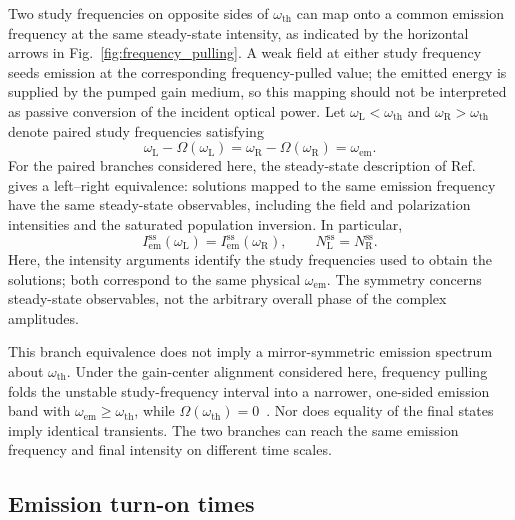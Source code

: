 \documentclass{optica-article}
\begin{document}
Two study frequencies on opposite sides of $\omega_{\mathrm{th}}$ can map onto a common emission frequency at the same steady-state intensity, as indicated by the horizontal arrows in Fig.~\ref{fig:frequency_pulling}. A weak field at either study frequency seeds emission at the corresponding frequency-pulled value; the emitted energy is supplied by the pumped gain medium, so this mapping should not be interpreted as passive conversion of the incident optical power. Let $\omega_{\mathrm{L}}<\omega_{\mathrm{th}}$ and $\omega_{\mathrm{R}}>\omega_{\mathrm{th}}$ denote paired study frequencies satisfying
\begin{equation}
\omega_{\mathrm{L}}-\Omega(\omega_{\mathrm{L}})
=\omega_{\mathrm{R}}-\Omega(\omega_{\mathrm{R}})
=\omega_{\mathrm{em}}.
\label{eq:pulling_branches}
\end{equation}
For the paired branches considered here, the steady-state description of Ref.~\cite{Aradian:2024} gives a left--right equivalence: solutions mapped to the same emission frequency have the same steady-state observables, including the field and polarization intensities and the saturated population inversion. In particular,
\begin{equation}
I_{\mathrm{em}}^{\mathrm{ss}}(\omega_{\mathrm{L}})
=I_{\mathrm{em}}^{\mathrm{ss}}(\omega_{\mathrm{R}}),
\qquad N_{\mathrm{L}}^{\mathrm{ss}}=N_{\mathrm{R}}^{\mathrm{ss}}.
\label{eq:pulling_steady_symmetry}
\end{equation}
Here, the intensity arguments identify the study frequencies used to obtain the solutions; both correspond to the same physical $\omega_{\mathrm{em}}$. The symmetry concerns steady-state observables, not the arbitrary overall phase of the complex amplitudes.

This branch equivalence does not imply a mirror-symmetric emission spectrum about $\omega_{\mathrm{th}}$. Under the gain-center alignment considered here, frequency pulling folds the unstable study-frequency interval into a narrower, one-sided emission band with $\omega_{\mathrm{em}}\geq\omega_{\mathrm{th}}$, while $\Omega(\omega_{\mathrm{th}})=0$~\cite{Aradian:2024}. Nor does equality of the final states imply identical transients. The two branches can reach the same emission frequency and final intensity on different time scales. %

\subsection{Emission turn-on times}
\end{document}
